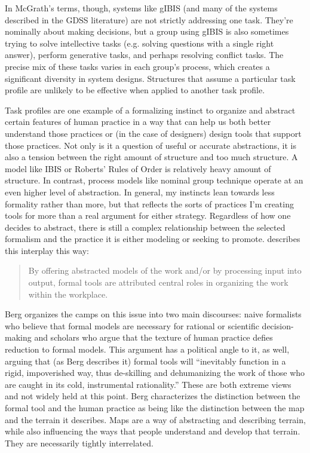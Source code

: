 In McGrath's terms, though, systems like gIBIS (and many of the systems described in the GDSS literature) are not strictly addressing one task. They're nominally about making decisions, but a group using gIBIS is also sometimes trying to solve intellective tasks (e.g. solving questions with a single right answer), perform generative tasks, and perhaps resolving conflict tasks. The precise mix of these tasks varies in each group's process, which creates a significant diversity in system designs. Structures that assume a particular task profile are unlikely to be effective when applied to another task profile.

Task profiles are one example of a formalizing instinct to organize and abstract certain features of human practice in a way that can help us both better understand those practices or (in the case of designers) design tools that support those practices. Not only is it a question of useful or accurate abstractions, it is also a tension between the right amount of structure and too much structure. A model like IBIS or Roberts' Rules of Order \citep{RobertIII:2000tq} is relatively heavy amount of structure. In contrast, process models like nominal group technique \citep{Bartunek:1984cq} operate at an even higher level of abstraction. In general, my instincts lean towards less formality rather than more, but that reflects the sorts of practices I'm creating tools for more than a real argument for either strategy. Regardless of how one decides to abstract, there is still a complex relationship between the selected formalism and the practice it is either modeling or seeking to promote. \citet{Berg:1997bs} describes this interplay this way:

\begin{quotation}
By offering abstracted models of the work and/or by processing input into output, formal tools are attributed central roles in organizing the work within the workplace.
\end{quotation}

Berg organizes the camps on this issue into two main discourses: naive formalists who believe that formal models are necessary for rational or scientific decision-making and scholars who argue that the texture of human practice defies reduction to formal models. This argument has a political angle to it, as well, arguing that (as Berg describes it) formal tools will ``inevitably function in a rigid, impoverished way, thus de-skilling and dehumanizing the work of those who are caught in its cold, instrumental rationality.'' These are both extreme views and not widely held at this point. Berg characterizes the distinction between the formal tool and the human practice as being like the distinction between the map and the terrain it describes. Maps are a way of abstracting and describing terrain, while also influencing the ways that people understand and develop that terrain. They are necessarily tightly interrelated.


